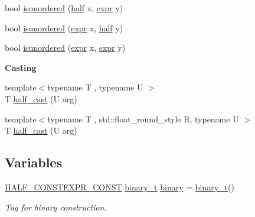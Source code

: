 \begin{Indent}
\begin{DoxyCompactItemize}
\item 
bool \hyperlink{namespacehalf__float_1_1detail_af94f1ec641bbd4dcf8528eeb01a2ac20}{isunordered} (\hyperlink{classhalf__float_1_1half}{half} x, \hyperlink{structhalf__float_1_1detail_1_1expr}{expr} y)
\item 
bool \hyperlink{namespacehalf__float_1_1detail_ad479f10441ff35fd89038940623edf32}{isunordered} (\hyperlink{structhalf__float_1_1detail_1_1expr}{expr} x, \hyperlink{classhalf__float_1_1half}{half} y)
\item 
bool \hyperlink{namespacehalf__float_1_1detail_a55803fd7a2045e188c2e23f312ef8390}{isunordered} (\hyperlink{structhalf__float_1_1detail_1_1expr}{expr} x, \hyperlink{structhalf__float_1_1detail_1_1expr}{expr} y)
\end{DoxyCompactItemize}
\end{Indent}
\begin{Indent}\textbf{ Casting}\par
\begin{DoxyCompactItemize}
\item 
{\footnotesize template$<$typename T , typename U $>$ }\\T \hyperlink{namespacehalf__float_1_1detail_a2d6a65bc1f34f19797f558a31deefe84}{half\+\_\+cast} (U arg)
\item 
{\footnotesize template$<$typename T , std\+::float\+\_\+round\+\_\+style R, typename U $>$ }\\T \hyperlink{namespacehalf__float_1_1detail_aa886fe2fe51f0ead5eca42060889b331}{half\+\_\+cast} (U arg)
\end{DoxyCompactItemize}
\end{Indent}
\subsection*{Variables}
\begin{DoxyCompactItemize}
\item 
\hyperlink{half_8hpp_a5df92c245e5d4e45d35fad7b6de73354}{H\+A\+L\+F\+\_\+\+C\+O\+N\+S\+T\+E\+X\+P\+R\+\_\+\+C\+O\+N\+ST} \hyperlink{structhalf__float_1_1detail_1_1binary__t}{binary\+\_\+t} \hyperlink{namespacehalf__float_1_1detail_a083e9a0ced4c4a5495ac89dd753dd215}{binary} = \hyperlink{structhalf__float_1_1detail_1_1binary__t}{binary\+\_\+t}()
\begin{DoxyCompactList}\small\item\em Tag for binary construction. \end{DoxyCompactList}\end{DoxyCompactItemize}


